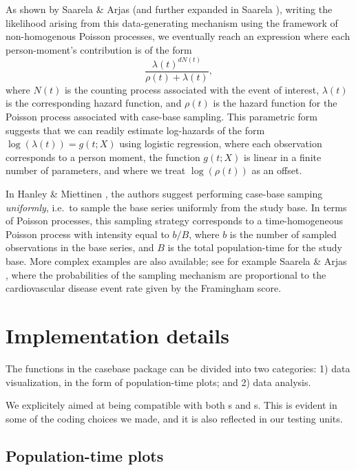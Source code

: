 \documentclass[article]{jss}
\begin{document}
As shown by Saarela \& Arjas \citeyearpar{saarela2015non} (and further
expanded in Saarela \citeyearpar{saarela2016case}), writing the
likelihood arising from this data-generating mechanism using the
framework of non-homogenous Poisson processes, we eventually reach an
expression where each person-moment's contribution is of the form
\[\frac{\lambda(t)^{dN(t)}}{\rho(t) + \lambda(t)},\] where \(N(t)\) is
the counting process associated with the event of interest,
\(\lambda(t)\) is the corresponding hazard function, and \(\rho(t)\) is
the hazard function for the Poisson process associated with case-base
sampling. This parametric form suggests that we can readily estimate
log-hazards of the form \(\log(\lambda(t)) = g(t; X)\) using logistic
regression, where each observation corresponds to a person moment, the
function \(g(t; X)\) is linear in a finite number of parameters, and
where we treat \(\log(\rho(t))\) as an offset.

In Hanley \& Miettinen \citeyearpar{hanley2009fitting}, the authors
suggest performing case-base samping \emph{uniformly}, i.e.~to sample
the base series uniformly from the study base. In terms of Poisson
processes, this sampling strategy corresponds to a time-homogeneous
Poisson process with intensity equal to \(b/B\), where \(b\) is the
number of sampled observations in the base series, and \(B\) is the
total population-time for the study base. More complex examples are also
available; see for example Saarela \& Arjas
\citeyearpar{saarela2015non}, where the probabilities of the sampling
mechanism are proportional to the cardiovascular disease event rate
given by the Framingham score.

\section{Implementation details}\label{implementation-details}

The functions in the casebase package can be divided into two
categories: 1) data visualization, in the form of population-time plots;
and 2) data analysis.

We explicitely aimed at being compatible with both s
and s. This is evident in some of the coding choices we
made, and it is also reflected in our testing units.

\subsection{Population-time plots}\label{population-time-plots}
\end{document}
